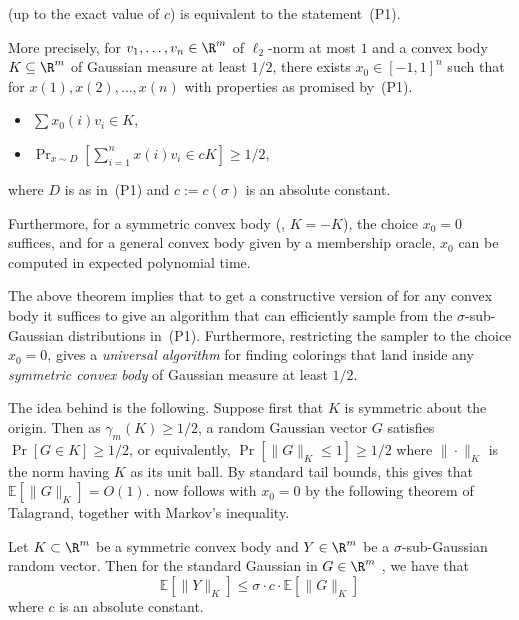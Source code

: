 \documentclass{toc}
\newcommand\E{\mathbb{E}}
\begin{document}
%
\begin{theorem}[Dadush et al.]\label{thm:subgaussian}     %
 (up to the exact value of $c$) is equivalent to
the statement~(P1).

More precisely, for $v_1,\dots,v_n \in \R^m$ of $\ell_2$-norm at most $1$ and a convex body $K
\subseteq \R^m$ of Gaussian measure at least $1/2$, there exists $x_0 \in
[-1,1]^n$ such that for $x(1), x(2), \ldots, x(n)$ with properties as promised by~(P1).
\begin{itemize}
\item[(i)] $\sum x_0(i) v_i \in K$,
\item[(ii)] $\Pr_{x \sim D}[\sum_{i=1}^n x(i) v_i \in cK] \ge 1/2$,
\end{itemize}
where $D$ is as in~(P1) and $c := c(\sigma)$ is an absolute constant.

Furthermore, for a symmetric convex body (\ie, $K=-K$), the choice $x_0 = 0$
suffices, and for a general convex body given by a membership oracle, $x_0$ can
be computed in expected polynomial time.
\end{theorem}

The above theorem implies that to get a constructive version of
 for any convex body it suffices to give an algorithm that
can efficiently sample from the $\sigma$-sub-Gaussian distributions
in~(P1). Furthermore, restricting the sampler to the choice $x_0 = 0$,
gives a \emph{universal algorithm} for finding colorings that land inside any
\emph{symmetric convex body} of Gaussian measure at least $1/2$.

The idea behind  is the following. Suppose first that $K$ is symmetric about the origin.
Then as $\gamma_m(K) \geq 1/2$, a random Gaussian vector $G$ satisfies $\Pr[G \in K] \geq 1/2$, or equivalently, $\Pr[ \|G\|_K \leq 1] \geq 1/2$ where $\| \cdot \|_K$ is the norm having $K$ as its unit ball. By standard tail bounds, this gives that $\E[\|G\|_K ] = O(1)$.  now follows with $x_0=0$ by the following theorem of Talagrand, together with Markov's inequality.

\begin{theorem} Let $K \subset \R^m$ be a symmetric convex body and $Y \in \R^m$ be a $\sigma$-sub-Gaussian random vector. Then for the standard Gaussian in $G \in \R^m$ , we have that
\[  \E[\|Y\|_K] \leq \sigma \cdot c \cdot \E[\|G\|_K]\]
where $c$ is an absolute constant.
\end{theorem}
\end{document}
